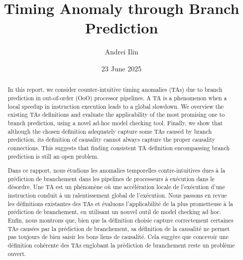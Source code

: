 \documentclass[12pt, a4paper]{memoir} %
\title{Timing Anomaly through Branch Prediction} %
\author{Andrei Ilin}
\date{23 June 2025} %
\begin{document}
\frontmatter
\begin{titlingpage}
\maketitle
\end{titlingpage}

\setlength{\parskip}{-1pt plus 1pt}

\renewcommand{\abstracttextfont}{\normalfont}
\abstractintoc
\begin{abstract} 
In this report, we consider counter-intuitive timing anomalies (TAs) due to branch prediction in out-of-order (OoO) processor pipelines. A TA is a phenomenon when a local speedup in instruction execution leads to a global slowdown. We overview the existing TAs definitions and evaluate the applicability of the most promising one to branch prediction, using a novel ad-hoc model checking tool. Finally, we show that although the chosen definition adequately capture some TAs caused by branch prediction, its definition of causality cannot always capture the proper causality connections. This suggests that finding consistent TA definition encompassing branch prediction is still an open problem.

\end{abstract}
\abstractintoc



\renewcommand\abstractname{R\'esum\'e}
\begin{abstract} 
Dans ce rapport, nous \'etudions les anomalies temporelles contre-intuitives dues \`a la pr\'ediction de branchement dans les pipelines de processeurs \`a ex\'ecution dans le d\'esordre. Une TA est un ph\'enom\`ene o\`u une acc\'el\'eration locale de l'ex\'ecution d'une instruction conduit \`a un ralentissement global de l'ex\'ecution. Nous passons en revue les d\'efinitions existantes des TAs et \'evaluons l'applicabilit\'e de la plus prometteuse \`a la pr\'ediction de branchement, en utilisant un nouvel outil de model checking ad hoc. Enfin, nous montrons que, bien que la d\'efinition choisie capture correctement certaines TAs caus\'ees par la pr\'ediction de branchement, sa d\'efinition de la causalit\'e ne permet pas toujours de bien saisir les bons liens de causalit\'e. Cela sugg\`ere que concevoir une d\'efinition coh\'erente des TAs englobant la pr\'ediction de branchement reste un probl\`eme ouvert.
\end{abstract}
\end{document}
